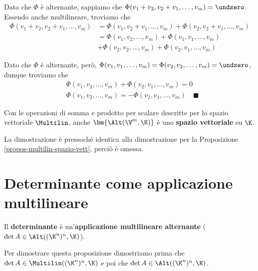\documentclass[11pt, a4paper, titlepage, oneside]{scrbook}
\begin{document}
\Dimostrazione \nopagebreak

Dato che $\Phi$ è alternante, sappiamo che $\Phi(v_1 + v_2, v_2 + v_1, \ldots, v_m) = \undzero$. Essendo anche multilineare, troviamo che 
\begin{align*}
\Phi(v_1 + v_2, v_2 + v_1, \ldots, v_m) &= \Phi(v_1, v_2 + v_1, \ldots, v_m) + \Phi(v_2, v_2 + v_1, \ldots, v_m) \\
 &= \Phi(v_1, v_2, \ldots, v_m) + \Phi(v_1, v_1, \ldots, v_m) \\
 &+ \Phi(v_2, v_2, \ldots, v_m) + \Phi(v_2, v_1, \ldots, v_m) 
\end{align*}

\vspace{-0.5cm}
Dato che $\Phi$ è alternante, però, $\Phi(v_1, v_1, \ldots, v_m) = \Phi(v_2, v_2, \ldots, v_m) = \undzero$, dunque troviamo che 
\begin{align*}
&\Phi(v_1, v_2, \ldots, v_m) + \Phi(v_2, v_1, \ldots, v_m) = 0 \\
&\Phi(v_1, v_2, \ldots, v_m) = - \Phi(v_2, v_1, \ldots, v_m) \quad \blacksquare
\end{align*}

\begin{Proposizione}[]
\label{propos-alt-spaz-vett}
Con le operazioni di somma e prodotto per scalare descritte per lo spazio vettoriale $\Multilin$, anche $\bm{\Alt(\V^m, \K)}$ è uno \textbf{spazio vettoriale} su $\K$.
\end{Proposizione}

La dimostrazione è pressoché identica alla dimostrazione per la Proposizione \ref{propos-multilin-spazio-vett}, perciò è omessa.

\section{Determinante come applicazione multilineare}

\begin{Proposizione}[]
\label{propos-determinante-app-multilineare}
Il \textbf{determinante} è un'\textbf{applicazione multilineare alternante} ($\det A \in \Alt((\K^n)^n, \K)$).
\end{Proposizione}

\Dimostrazione \nopagebreak

Per dimostrare questa proposizione dimostriamo prima che $\det A \in \Multilin((\K^n)^n, \K)$ e poi che $\det A \in \Alt((\K^n)^n, \K)$.
\end{document}
